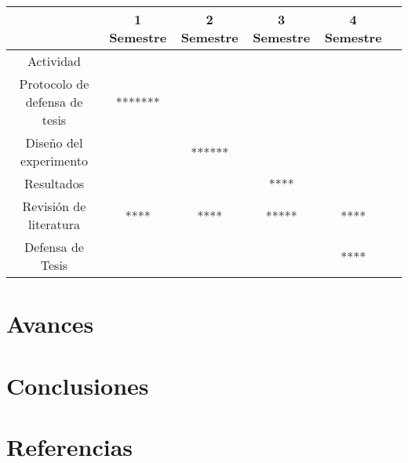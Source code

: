 \documentclass[]{report}
\begin{document}
\begin{tabular}{|c|c|c|c|c|c|}
	\hline 
	& 1 Semestre  & 2 Semestre  & 3 Semestre  & 4 Semestre \\ 
	\hline 
	Actividad &  &  &  &  \\ 
	\hline
	Protocolo de defensa de tesis & ******* &  &  &  \\ 
	\hline 
	Diseño del experimento  &  &******  &  &  \\ 
	\hline
	Resultados &  &  &****  &  \\ 
	\hline
	Revisión de literatura &****  &****  &*****  &****  \\ 
	\hline 
	Defensa de Tesis &  &  &  &****  \\ 
	\hline  
\end{tabular} 

\chapter{Avances}

\chapter{Conclusiones}

\chapter {Referencias}


\end{document}
